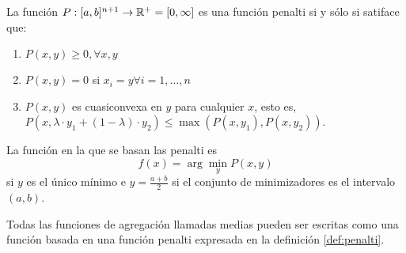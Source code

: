 \documentclass[main]{subfiles}
\begin{document}
\begin{definition}\label{def:penalti}
La función ${P:[a,b]^{n+1}\rightarrow \mathbb{R}^{+} = [0, \infty]}$ es una función penalti si y sólo si satiface que:
\begin{enumerate}
	\item $P(x, y) \geq 0, \forall x, y$
	\item $P(x, y) = 0$ si $x_{i}=y \forall i=1,\dots ,n$
	\item $P(x,y)$ es cuasiconvexa en $y$ para cualquier $x$, esto es, $P(x, \lambda\cdot y_{1} +(1-\lambda)\cdot y_{2})\leq \max(P(x, y_{1}), P(x, y_{2}))$.
\end{enumerate}
\end{definition}
La función en la que se basan las penalti es $$f(x)=\arg\min_{y} P(x,y)$$ si $y$ es el único mínimo e ${y=\frac{a+b}{2}}$ si el conjunto de minimizadores es el intervalo ${(a, b)}$.

\begin{theorem}
Todas las funciones de agregación llamadas medias pueden ser escritas como una función basada en una función penalti expresada en la definición \ref{def:penalti}.
\end{theorem}
\end{document}
